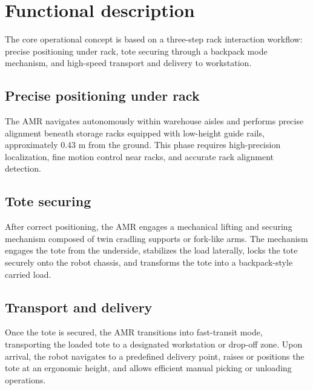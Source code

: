 \section*{Functional description}

The core operational concept is based on a three-step rack interaction workflow: precise positioning under rack, tote securing through a backpack mode mechanism, and high-speed transport and delivery to workstation.

\subsection*{Precise positioning under rack}

The AMR navigates autonomously within warehouse aisles and performs precise alignment beneath storage racks equipped with low-height guide rails, approximately 0.43 m from the ground. This phase requires high-precision localization, fine motion control near racks, and accurate rack alignment detection.

\subsection*{Tote securing}

After correct positioning, the AMR engages a mechanical lifting and securing mechanism composed of twin cradling supports or fork-like arms. The mechanism engages the tote from the underside, stabilizes the load laterally, locks the tote securely onto the robot chassis, and transforms the tote into a backpack-style carried load.

\subsection*{Transport and delivery}

Once the tote is secured, the AMR transitions into fast-transit mode, transporting the loaded tote to a designated workstation or drop-off zone. Upon arrival, the robot navigates to a predefined delivery point, raises or positions the tote at an ergonomic height, and allows efficient manual picking or unloading operations.
